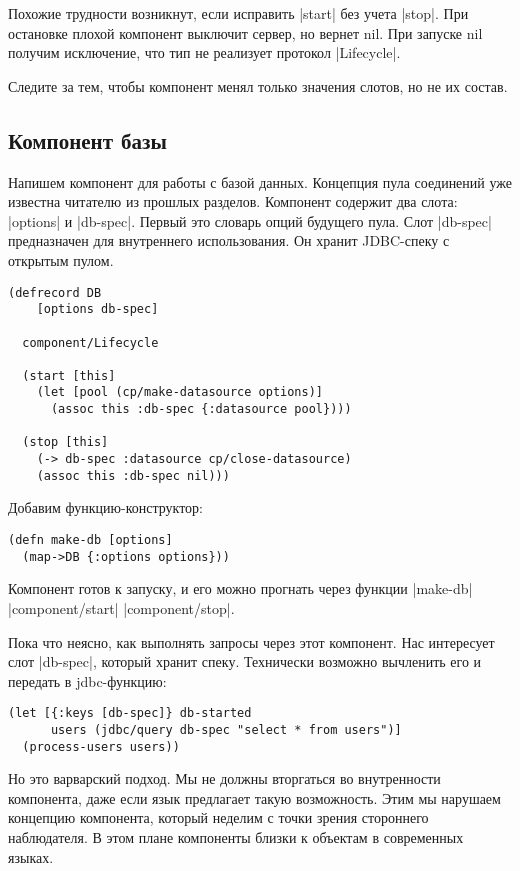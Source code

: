 Похожие трудности возникнут, если исправить \spverb|start| без учета \spverb|stop|. При
остановке плохой компонент выключит сервер, но вернет nil. При запуске nil
получим исключение, что тип не реализует протокол \spverb|Lifecycle|.

Следите за тем, чтобы компонент менял только значения слотов, но не их состав.

\subsection{Компонент базы}

Напишем компонент для работы с базой данных. Концепция пула соединений уже
известна читателю из прошлых разделов. Компонент содержит два слота: \spverb|options| и
\spverb|db-spec|. Первый это словарь опций будущего пула. Слот \spverb|db-spec| предназначен
для внутреннего использования. Он хранит JDBC-спеку с открытым пулом.

\begin{verbatim}
(defrecord DB
    [options db-spec]

  component/Lifecycle

  (start [this]
    (let [pool (cp/make-datasource options)]
      (assoc this :db-spec {:datasource pool})))

  (stop [this]
    (-> db-spec :datasource cp/close-datasource)
    (assoc this :db-spec nil)))
\end{verbatim}

Добавим функцию-конструктор:

\begin{verbatim}
(defn make-db [options]
  (map->DB {:options options}))
\end{verbatim}

Компонент готов к запуску, и его можно прогнать через функции \spverb|make-db| %
\spverb|component/start| %
\spverb|component/stop|.

Пока что неясно, как выполнять запросы через этот компонент. Нас интересует слот
\spverb|db-spec|, который хранит спеку. Технически возможно вычленить его и передать в
jdbc-функцию:

\begin{verbatim}
(let [{:keys [db-spec]} db-started
      users (jdbc/query db-spec "select * from users")]
  (process-users users))
\end{verbatim}

Но это варварский подход. Мы не должны вторгаться во внутренности компонента,
даже если язык предлагает такую возможность. Этим мы нарушаем концепцию
компонента, который неделим с точки зрения стороннего наблюдателя. В этом плане
компоненты близки к объектам в современных языках.

